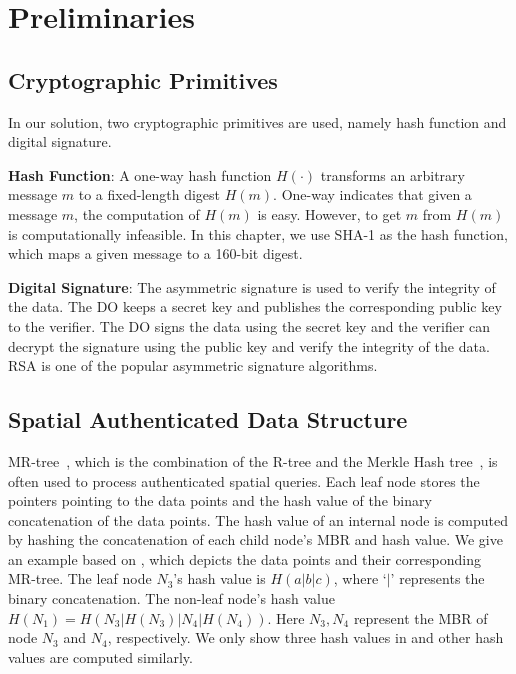 \section{Preliminaries}\label{sec:knn:prelim}

\subsection{Cryptographic Primitives}

In our solution, two cryptographic primitives are used, namely hash function and digital signature.

\textbf{Hash Function}: A one-way hash function $H(\cdot)$ transforms an arbitrary message $m$ to a fixed-length digest $H(m)$. One-way indicates that given a message $m$, the computation of $H(m)$ is easy. However, to get $m$ from $H(m)$ is computationally infeasible. In this chapter, we use SHA-1 as the hash function, which maps a given message to a 160-bit digest.

\textbf{Digital Signature}: The asymmetric signature is used to verify the integrity of the data. The DO keeps a secret key and publishes the corresponding public key to the verifier. The DO signs the data using the secret key and the verifier can decrypt the signature using the public key and verify the integrity of the data. RSA is one of the popular asymmetric signature algorithms.

\subsection{Spatial Authenticated Data Structure}

MR-tree~\cite{10.1007/s00778-008-0113-2}, which is the combination of the R-tree and the Merkle Hash tree~\cite{10.1007/0-387-34805-0_21}, is often used to process authenticated spatial queries. Each leaf node stores the pointers pointing to the data points and the hash value of the binary concatenation of the data points. The hash value of an internal node is computed by hashing the concatenation of each child node's MBR and hash value. We give an example based on , which depicts the data points and their corresponding MR-tree. The leaf node $N_{3}$'s hash value is $H(a|b|c)$, where `$|$' represents the binary concatenation. The non-leaf node's hash value $H(N_{1})=H(N_{3}|H(N_{3})|N_{4}|H(N_{4}))$. Here $N_{3}, N_{4}$ represent the MBR of node $N_{3}$ and $N_{4}$, respectively. We only show three hash values in  and other hash values are computed similarly.

